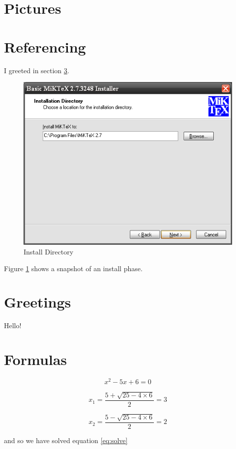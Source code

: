 \documentclass[12pt,a4paper,oneside,onecolumn]{article}
\begin{document}
	\section{Pictures}
	\label{sec:Pictures}

	\section{Referencing}

	I greeted in section \ref{sec:greetings}.

	\begin{figure}[htp]
		\centering
		\includegraphics[scale=0.6]{Directory}
		\caption{Install Directory}
		\label{fig:directory}
	\end{figure}
	Figure \ref{fig:directory} shows a snapshot of an install phase.


	\section{Greetings}
	\label{sec:greetings}

	Hello!

	\clearpage

	\section{Formulas}
	\label{sec:Formulas}

	\begin{equation} \label{eq:solve}
	x^2 - 5 x + 6 = 0
	\end{equation}

	\begin{equation}
	x_1 = \frac{5 + \sqrt{25 - 4 \times 6}}{2} = 3
	\end{equation}

	\begin{equation}
	x_2 = \frac{5 - \sqrt{25 - 4 \times 6}}{2} = 2
	\end{equation}

	and so we have solved equation \ref{eq:solve}
\end{document}
